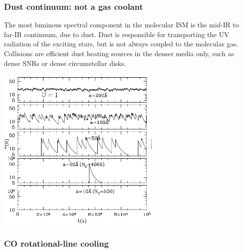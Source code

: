\begin{frame}
\vfill

\end{frame} \begin{frame}\frametitle{Dust continuum: not a gas coolant}

The most luminous spectral component in the molecular ISM is the
mid-IR to far-IR continuum, due to dust. Dust is responsible for
transporting the UV radiation of the exciting stars, but is not always
coupled to the molecular gas. Collisions are efficient dust heating
sources in the denser media only, such as dense SNRs or dense
circumstellar disks.

\centering\includegraphics[width=0.6\textwidth,height=!]{./B/grain_temp.png}

\end{frame} \begin{frame}\frametitle{CO rotational-line cooling}


\end{frame}
